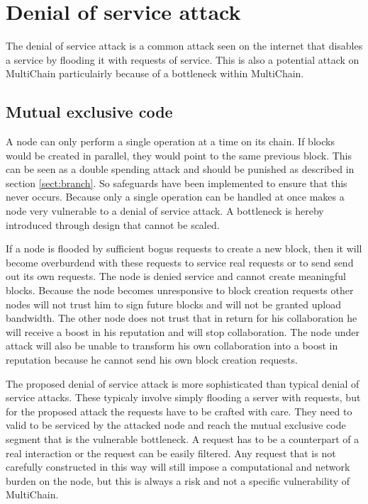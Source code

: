 \section{Denial of service attack}
The denial of service attack is a common attack seen on the internet
that disables a service by flooding it with requests of service.
This is also a potential attack on MultiChain particulairly because of a bottleneck within MultiChain.

\subsection{Mutual exclusive code}
A node can only perform a single operation at a time on its chain.
If blocks would be created in parallel, they would point to the same previous block.
This can be seen as a double spending attack and should be punished as described in section \ref{sect:branch}.
So safeguards have been implemented to ensure that this never occurs.
Because only a single operation can be handled at once
makes a node very vulnerable to a denial of service attack.
A bottleneck is hereby introduced through design that cannot be scaled.

If a node is flooded by sufficient bogus requests to create a new block,
then it will become overburdend with these requests to service real requests or to send send out its own requests.
The node is denied service and cannot create meaningful blocks.
Because the node becomes unresponsive to block creation requests other nodes will not trust him to sign future blocks
and will not be granted upload bandwidth.
The other node does not trust that in return for his collaboration he will receive a boost in his reputation
and will stop collaboration.
The node under attack will also be unable to transform his own collaboration into a boost in reputation
because he cannot send his own block creation requests.

The proposed denial of service attack is more sophisticated than typical denial of service attacks.
These typicaly involve simply flooding a server with requests,
but for the proposed attack the requests have to be crafted with care.
They need to valid to be serviced by the attacked node and reach the mutual exclusive code segment
that is the vulnerable bottleneck.
A request has to be a counterpart of a real interaction or the request can be easily filtered.
Any request that is not carefully constructed in this way
will still impose a computational and network burden on the node,
but this is always a risk and not a specific vulnerability of MultiChain.

